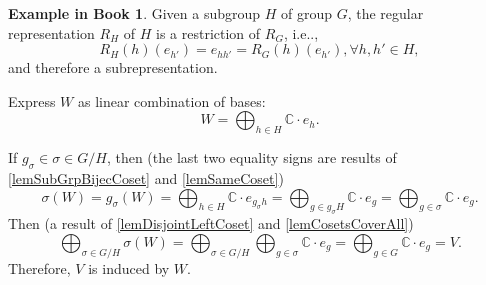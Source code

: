 \documentclass[12pt, letterpaper]{article}
\makeatletter
\newcommand{\co}{\mathbb{C}}
\newcommand\ie{i.e\@ifnextchar.{}{.\@}}
\newcommand{\red}[1]{{\color{red} #1}}
\theoremstyle{definition}
\theoremstyle{remark}
\theoremstyle{definition}
\newtheorem{exam}[exe]{Example in Book}
\theoremstyle{plain}
\numberwithin{equation}{section}
\makeatother
\begin{document}
	\begin{exam}
		Given a subgroup $H$ of group $G$, the regular representation $R_H$
		of $H$ is a restriction of $R_G$, \ie,
		\[ R_H(h)(e_{h'})=e_{hh'}=R_G(h)(e_{h'}),\forall h,h'\in H, \]
		and therefore a subrepresentation.
		
		Express $W$ as linear combination of bases:
		\[W=\bigoplus_{h\in H}\co\cdot e_h.\]
		
		If $g_{\sigma}\in\sigma\in G/H$, then
		(the last two equality signs are results of \autoref{lemSubGrpBijecCoset} and \autoref{lemSameCoset})
		\[\sigma (W) = g_{\sigma} (W)=\bigoplus_{h\in H}\co\cdot e_{g_{\sigma}h}=\bigoplus_{g\in g_\sigma H}\co\cdot e_{g}=\bigoplus_{g\in \sigma}\co\cdot e_{g}.\]
		Then (a result of \autoref{lemDisjointLeftCoset} and \autoref{lemCosetsCoverAll})
		\[\bigoplus_{\sigma\in G/H} \sigma (W)= \bigoplus_{\sigma\in G/H}\bigoplus_{g\in \sigma}\co\cdot e_{g}=\bigoplus_{g\in G}
		\co\cdot e_g=V. \]
		Therefore, $V$ is induced by $W$.
	\end{exam}
	
\end{document}
